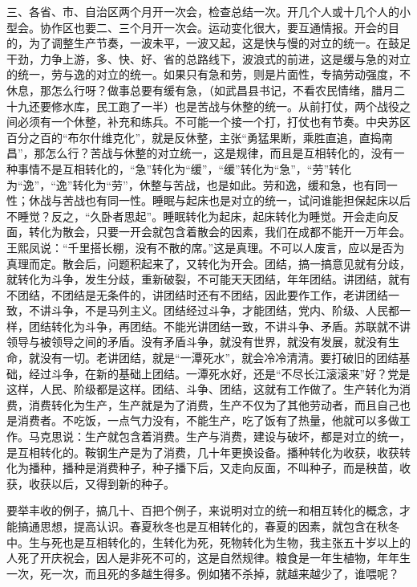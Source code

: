 三、各省、市、自治区两个月开一次会，检查总结一次。开几个人或十几个人的小型会。协作区也要二、三个月开一次会。运动变化很大，要互通情报。开会的目的，为了调整生产节奏，一波未平，一波又起，这是快与慢的对立的统一。在鼓足干劲，力争上游，多、快、好、省的总路线下，波浪式的前进，这是缓与急的对立的统一，劳与逸的对立的统一。如果只有急和劳，则是片面性，专搞劳动强度，不休息，那怎么行呀？做事总要有缓有急，（如武昌县书记，不看农民情绪，腊月二十九还要修水库，民工跑了一半）也是苦战与休整的统一。从前打仗，两个战役之间必须有一个休整，补充和练兵。不可能一个接一个打，打仗也有节奏。中央苏区百分之百的“布尔什维克化”，就是反休整，主张“勇猛果断，乘胜直追，直捣南昌”，那怎么行？苦战与休整的对立统一，这是规律，而且是互相转化的，没有一种事情不是互相转化的，“急”转化为“缓”，“缓”转化为“急”，“劳”转化为“逸”，“逸”转化为“劳”，休整与苦战，也是如此。劳和逸，缓和急，也有同一性；休战与苦战也有同一性。睡眠与起床也是对立的统一，试问谁能担保起床以后不睡觉？反之，“久卧者思起”。睡眠转化为起床，起床转化为睡觉。开会走向反面，转化为散会，只要一开会就包含着散会的因素，我们在成都不能开一万年会。王熙凤说：“千里搭长棚，没有不散的席。”这是真理。不可以人废言，应以是否为真理而定。散会后，问题积起来了，又转化为开会。团结，搞一搞意见就有分歧，就转化为斗争，发生分歧，重新破裂，不可能天天团结，年年团结。讲团结，就有不团结，不团结是无条件的，讲团结时还有不团结，因此要作工作，老讲团结一致，不讲斗争，不是马列主义。团结经过斗争，才能团结，党内、阶级、人民都一样，团结转化为斗争，再团结。不能光讲团结一致，不讲斗争、矛盾。苏联就不讲领导与被领导之间的矛盾。没有矛盾斗争，就没有世界，就没有发展，就没有生命，就没有一切。老讲团结，就是“一潭死水”，就会冷冷清清。要打破旧的团结基础，经过斗争，在新的基础上团结。一潭死水好，还是“不尽长江滚滚来”好？党是这样，人民、阶级都是这样。团结、斗争、团结，这就有工作做了。生产转化为消费，消费转化为生产，生产就是为了消费，生产不仅为了其他劳动者，而且自己也是消费者。不吃饭，一点气力没有，不能生产，吃了饭有了热量，他就可以多做工作。马克思说：生产就包含着消费。生产与消费，建设与破坏，都是对立的统一，是互相转化的。鞍钢生产是为了消费，几十年更换设备。播种转化为收获，收获转化为播种，播种是消费种子，种子播下后，又走向反面，不叫种子，而是秧苗，收获，收获以后，又得到新的种子。

要举丰收的例子，搞几十、百把个例子，来说明对立的统一和相互转化的概念，才能搞通思想，提高认识。春夏秋冬也是互相转化的，春夏的因素，就包含在秋冬中。生与死也是互相转化的，生转化为死，死物转化为生物，我主张五十岁以上的人死了开庆祝会，因人是非死不可的，这是自然规律。粮食是一年生植物，年年生一次，死一次，而且死的多越生得多。例如猪不杀掉，就越来越少了，谁喂呢？

